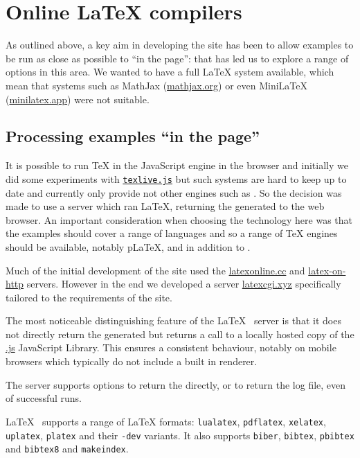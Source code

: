 \documentclass[harvardcite]{ltugboat}
\begin{document}
\section{Online \LaTeX{} compilers}

As outlined above, a key aim in developing the site has been to allow examples
to be run as close as possible to \enquote{in the page}: that has led us to
explore a range of options in this area. We wanted to have a full \LaTeX{}
system available, which mean that systems such as MathJax (\url{mathjax.org})
or even Mini\LaTeX{} (\url{minilatex.app}) were not suitable.

\subsection{Processing examples \enquote{in the page}}

It is possible to run \TeX{} in the JavaScript engine in the browser and
initially we did some experiments with
\href{https://github.com/manuels/texlive.js/}{\texttt{texlive.js}} but
such systems are hard to keep up to date and currently only provide
 not other engines such as . So the decision was
made to use a server which ran \LaTeX{}, returning the generated 
to the web browser.  An important consideration when choosing the
technology here was that the examples should cover a range of
languages and so a range of \TeX{} engines should be available,
notably p\LaTeX{},  and  in addition to
.

Much of the initial development of the site used the
\href{https://latexonline.cc}{latexonline.cc}
and
\href{https://latex.ytotech.com/}{latex-on-http}
servers. However in
the end we developed a server
\url{latexcgi.xyz}
specifically tailored to the
requirements of the site.

The most noticeable distinguishing feature of the \LaTeX{}~ server
is that it does not directly return the generated  but returns a
call to a locally hosted copy of the
\href{https://mozilla.github.io/pdf.js/}{.js}
JavaScript Library. This ensures a consistent behaviour, notably on
mobile browsers which typically do not include a built in 
renderer.

The server supports options to return the  directly, or to return
the log file, even of successful runs.

\LaTeX{}~ supports a range of \LaTeX{} formats:
\texttt{lualatex}, \texttt{pdflatex}, \texttt{xelatex},
\texttt{uplatex}, \texttt{platex} and their \texttt{-dev} variants. It also
supports \texttt{biber}, \texttt{bibtex}, \texttt{pbibtex} and \texttt{bibtex8} and \texttt{makeindex}.
\end{document}
